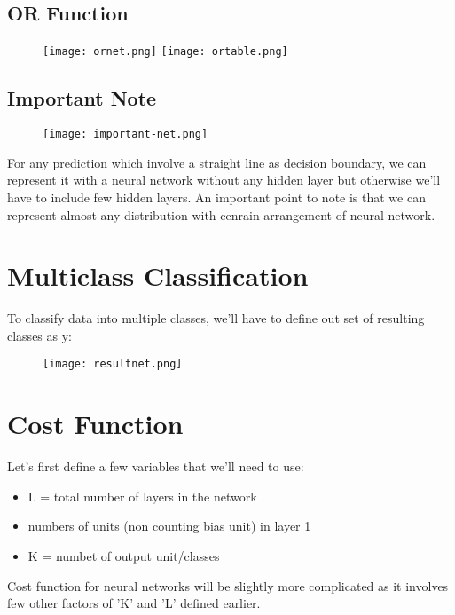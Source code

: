     \subsection{OR Function}
      \begin{figure}[h]
        \centering
        \texttt{[image: ornet.png]}
        \texttt{[image: ortable.png]}
      \end{figure}

    \subsection{Important Note}
      \begin{figure}[h]
        \centering
        \texttt{[image: important-net.png]}
      \end{figure}

      For any prediction which involve a straight line as decision boundary, we can represent it with a neural network without any hidden layer but otherwise we'll have to include few hidden layers. An important point to note is that we can represent almost any distribution with cenrain arrangement of neural network.

  \section{Multiclass Classification}
    To classify data into multiple classes, we'll have to define out set of resulting classes as y:
    \begin{figure}[h]
      \centering
      \texttt{[image: resultnet.png]}
    \end{figure}

  \section{Cost Function}
    Let's first define a few variables that we'll need to use:
    
    \begin{itemize}
      \item L = total number of layers in the network
      \item numbers of units (non counting bias unit) in layer 1
      \item K = numbet of output unit/classes
    \end{itemize}

    Cost function for neural networks will be slightly more complicated as it involves few other factors of 'K' and 'L' defined earlier.

